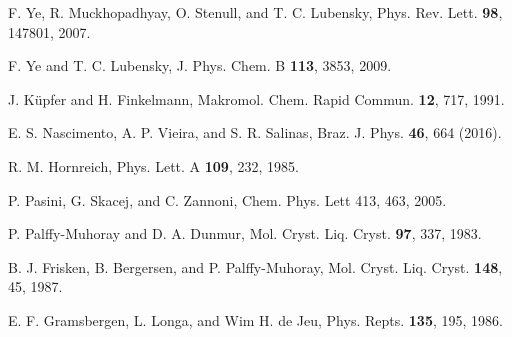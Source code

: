\documentclass[aps,pre,reprint,amsmath,amssymbols,superscriptaddress,
nofootinbib]{revtex4-1}
\begin{document}
\begin{thebibliography}{99}
F. Ye, R. Muckhopadhyay, O. Stenull, and T. C. Lubensky,
Phys. Rev. Lett. \textbf{98}, 147801, 2007.

F. Ye and T. C. Lubensky, J. Phys. Chem. B \textbf{113},
3853, 2009.

J. K\"upfer and H. Finkelmann, Makromol. Chem. Rapid
Commun. \textbf{12}, 717, 1991.

E. S. Nascimento, A. P. Vieira, and S. R. Salinas,
Braz. J. Phys. \textbf{46}, 664 (2016).

R. M. Hornreich, Phys. Lett. A \textbf{109}, 232, 1985.

P. Pasini, G. Skacej, and C. Zannoni, Chem. Phys. Lett
413, 463, 2005.

P. Palffy-Muhoray and D. A. Dunmur, Mol. Cryst. Liq.
Cryst. \textbf{97}, 337, 1983.

B. J. Frisken, B. Bergersen, and P. Palffy-Muhoray, Mol.
Cryst. Liq. Cryst. \textbf{148}, 45, 1987.

E. F. Gramsbergen, L. Longa, and Wim H. de Jeu,
Phys. Repts. \textbf{135}, 195, 1986.
\end{thebibliography}



%


\end{document}
